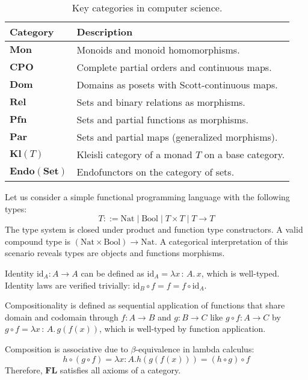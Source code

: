 \begin{table*}[h!]
\centering
\begin{tabular}{ll}
\hline
\textbf{Category} & \textbf{Description} \\
  \hline
$\mathbf{Mon}$ & Monoids and monoid homomorphisms. \\
$\mathbf{CPO}$        & Complete partial orders and continuous maps. \\
$\mathbf{Dom}$        & Domains as posets with Scott-continuous maps. \\
$\mathbf{Rel}$        & Sets and binary relations as morphisms. \\
$\mathbf{Pfn}$        & Sets and partial functions as morphisms. \\
$\mathbf{Par}$        & Sets and partial maps (generalized morphisms). \\
$\mathbf{Kl}(T)$      & Kleisli category of a monad $T$ on a base category. \\
$\mathbf{Endo(Set)}$  & Endofunctors on the category of sets. \\
\hline
\end{tabular}
\caption{Key categories in computer science.}
\label{tab:cs-categories}
\end{table*}


\begin{example}
Let us consider a simple functional
programming language with the following types:
\[
  T ::= \mathrm{Nat} \mid \mathrm{Bool} \mid T \times T \mid T \to T
\]
The type system is closed under product and function type
constructors. A valid compound type is \( (\mathrm{Nat} \times \mathrm{Bool}) \to \mathrm{Nat} \).
A categorical interpretation of this scenario reveals types are objects and functions morphisms.

Identity \(\mathrm{id}_A : A \to A\) can be defined as \( \mathrm{id}_A = \lambda x\,{:}\,A . \, x  \), which is well-typed. Identity laws are verified trivially: \( \mathrm{id}_B \circ f = f = f \circ \mathrm{id}_A \).

Compositionality is defined as sequential application of functions that share domain and codomain through \(f : A \to B\) and \(g : B \to C\) like \(g \circ f : A \to C\) by \(g \circ f = \lambda x\,{:}\,A . \, g (f(x))\), which is well-typed by function application.

Composition is associative due to \(\beta\)-equivalence in lambda calculus:
\[
h \circ (g \circ f) = \lambda x{:}A . h (g (f(x))) = (h \circ g) \circ f
\]
Therefore, \(\mathbf{FL}\) satisfies all axioms of a category.
\end{example}


